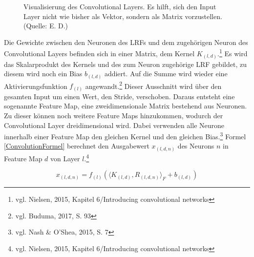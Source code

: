 \documentclass[
	a4paper,
	12pt,
	ngerman,
	oneside
]{scrreprt}											%
\newcommand{\fundamentals}[1]{vgl. Buduma, 2017, S. {#1}}
\newcommand{\cnnKlein}[1]{vgl. Nash \& O'Shea, 2015, S. {#1}}
\begin{document}
\begin{figure}
					\caption{Visualisierung des Convolutional Layers. Es hilft, sich den Input Layer nicht wie bisher als Vektor, sondern als Matrix vorzustellen. (Quelle: E. D.)}\label{LRF}
				\end{figure}
				Die Gewichte zwischen den Neuronen des LRFs und dem zugehörigen Neuron des Convolutional Layers befinden sich in einer Matrix, dem Kernel $K_{(l,d)}$.\footnote{vgl. Nielsen, 2015, Kapitel 6/Introducing convolutional networks} Es wird das Skalarprodukt des Kernels und des zum Neuron zugehörige LRF gebildet, zu diesem wird noch ein Bias $b_{(l,d)}$ addiert. Auf die Summe wird wieder eine Aktivierungsfunktion $f_{(l)}$ angewandt.\footnote{\fundamentals{93}} Dieser Ausschnitt wird über den gesamten Input um einen Wert, den Stride, verschoben. Daraus entsteht eine sogenannte Feature Map, eine zweidimensionale Matrix bestehend aus Neuronen. Zu dieser können noch weitere Feature Maps hinzukommen, wodurch der Convolutional Layer dreidimensional wird. Dabei verwenden alle Neurone innerhalb einer Feature Map den gleichen Kernel und den gleichen Bias.\footnote{\cnnKlein{7}} Formel \ref{ConvolutionFormel} berechnet den Ausgabewert $x_{(l,d,n)}$ des Neurons $n$ in Feature Map $d$ von Layer $l$.\footnote{vgl. Nielsen, 2015, Kapitel 6/Introducing convolutional networks}
		
				\begin{equation}\label{ConvolutionFormel}
					x_{(l,d,n)} = f_{(l)} \left( \langle K_{(l,d)},R_{(l,d,n)} \rangle_F + b_{(l,d)} \right)
				\end{equation}
		
\end{document}
